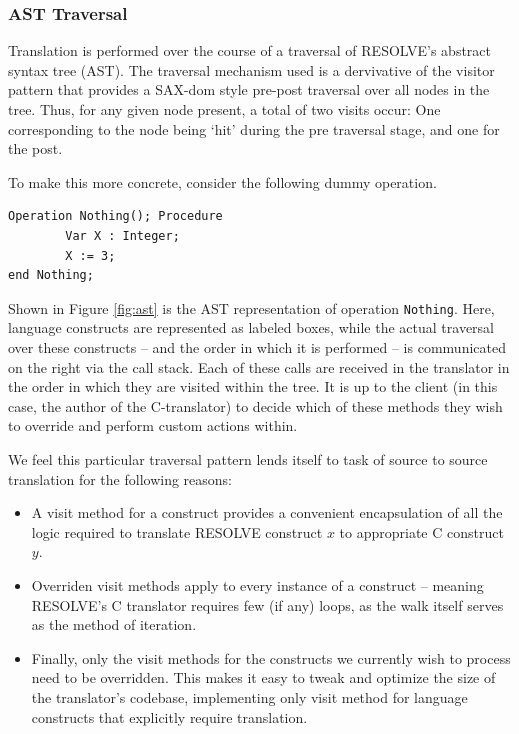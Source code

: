 \documentclass{sig-alternate}
\begin{document}
\subsubsection{AST Traversal}
Translation is performed over the course of a traversal of RESOLVE's abstract syntax tree (AST). The traversal mechanism used is a dervivative of the visitor pattern that provides a SAX-dom style pre-post traversal over all nodes in the tree. Thus, for any given node present, a total of two visits occur: One corresponding to the node being `hit' during the pre traversal stage, and one for the post. 

To make this more concrete, consider the following dummy operation.

\begin{verbatim}
Operation Nothing(); Procedure
        Var X : Integer;
        X := 3;
end Nothing;
\end{verbatim}

Shown in Figure \ref{fig:ast} is the AST representation of operation \texttt{Nothing}. Here, language constructs are represented as labeled boxes, while the actual traversal over these constructs -- and the order in which it is performed -- is communicated on the right via the call stack. Each of these calls are received in the translator in the order in which they are visited within the tree. It is up to the client (in this case, the author of the C-translator) to decide which of these methods they wish to override and perform custom actions within. 

We feel this particular traversal pattern lends itself to task of source to source translation for the following reasons:

\begin{itemize}
\item A visit method for a construct provides a convenient encapsulation of all the logic required to translate RESOLVE construct $x$ to appropriate C construct $y$.

\item Overriden visit methods apply to every instance of a construct -- meaning RESOLVE's C translator requires few (if any) loops, as the walk itself serves as the method of iteration.

\item Finally, only the visit methods for the constructs we currently wish to process need to be overridden. This makes it easy to tweak and optimize the size of the translator's codebase, implementing only visit method for language constructs that explicitly require translation.  
\end{itemize}
\end{document}
